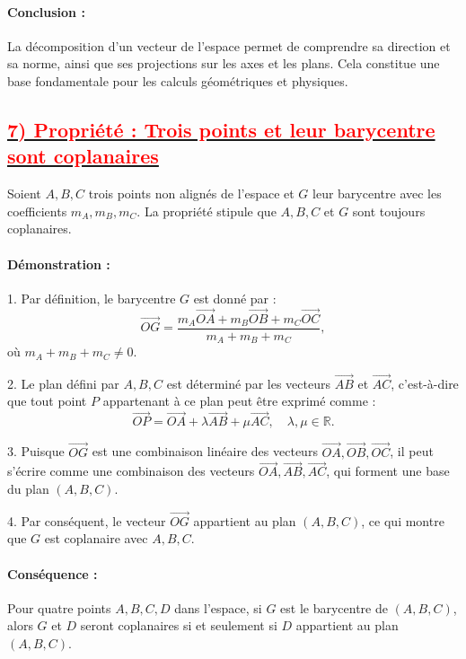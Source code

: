 \documentclass{article}
\begin{document}
\paragraph{Conclusion :}  
La décomposition d’un vecteur de l’espace permet de comprendre sa direction et sa norme, ainsi que ses projections sur les axes et les plans. Cela constitue une base fondamentale pour les calculs géométriques et physiques.


\subsection*{\underline{\textbf{\textcolor{red}{7) Propriété : Trois points et leur barycentre sont coplanaires}}}}

Soient \( A, B, C \) trois points non alignés de l’espace et \( G \) leur barycentre avec les coefficients \( m_A, m_B, m_C \).  
La propriété stipule que \( A, B, C \) et \( G \) sont toujours coplanaires.

\paragraph{Démonstration :}  

1. Par définition, le barycentre \( G \) est donné par :  
   \[
   \overrightarrow{OG} = \frac{m_A\overrightarrow{OA} + m_B\overrightarrow{OB} + m_C\overrightarrow{OC}}{m_A + m_B + m_C},
   \]
   où \( m_A + m_B + m_C \neq 0 \).

2. Le plan défini par \( A, B, C \) est déterminé par les vecteurs \( \overrightarrow{AB} \) et \( \overrightarrow{AC} \), c'est-à-dire que tout point \( P \) appartenant à ce plan peut être exprimé comme :  
   \[
   \overrightarrow{OP} = \overrightarrow{OA} + \lambda \overrightarrow{AB} + \mu \overrightarrow{AC}, \quad \lambda, \mu \in \mathbb{R}.
   \]

3. Puisque \( \overrightarrow{OG} \) est une combinaison linéaire des vecteurs \( \overrightarrow{OA}, \overrightarrow{OB}, \overrightarrow{OC} \), il peut s'écrire comme une combinaison des vecteurs \( \overrightarrow{OA}, \overrightarrow{AB}, \overrightarrow{AC} \), qui forment une base du plan \( (A, B, C) \).

4. Par conséquent, le vecteur \( \overrightarrow{OG} \) appartient au plan \( (A, B, C) \), ce qui montre que \( G \) est coplanaire avec \( A, B, C \).

\paragraph{Conséquence :}  
Pour quatre points \( A, B, C, D \) dans l’espace, si \( G \) est le barycentre de \( (A, B, C) \), alors \( G \) et \( D \) seront coplanaires si et seulement si \( D \) appartient au plan \( (A, B, C) \).
\end{document}
